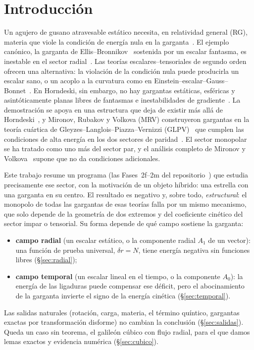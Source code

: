\documentclass[11pt,a4paper]{article}
\theoremstyle{remark}
\begin{document}
\tableofcontents

\section{Introducción}

Un agujero de gusano atravesable estático necesita, en relatividad general (RG), materia que viole la condición de energía nula en la garganta~\cite{MorrisThorne}. El ejemplo canónico, la garganta de Ellis--Bronnikov~\cite{Ellis,Bronnikov} sostenida por un escalar fantasma, es inestable en el sector radial~\cite{GonzalezGuzmanSarbach}. Las teorías escalares--tensoriales de segundo orden ofrecen una alternativa: la violación de la condición nula puede producirla un escalar sano, o un acoplo a la curvatura como en Einstein--escalar--Gauss--Bonnet~\cite{KKK,Canate}. En Horndeski, sin embargo, no hay gargantas estáticas, esféricas y asintóticamente planas libres de fantasmas e inestabilidades de gradiente~\cite{Rubakov,EvseevMelichev}. La demostración se apoya en una estructura que deja de existir más allá de Horndeski~\cite{Franciolini}, y Mironov, Rubakov y Volkova (MRV) construyeron gargantas en la teoría cuártica de Gleyzes--Langlois--Piazza--Vernizzi (GLPV)~\cite{GLPV} que cumplen las condiciones de alta energía en los dos sectores de paridad~\cite{MRV1,MRV2,MRV3}. El sector monopolar se ha tratado como uno más del sector par, y el análisis completo de Mironov y Volkova~\cite{MironovVolkova} supone que no da condiciones adicionales.

Este trabajo resume un programa (las Fases~2f--2m del repositorio~\cite{repo}) que estudia precisamente ese sector, con la motivación de un objeto híbrido: una estrella con una garganta en su centro. El resultado es negativo y, sobre todo, \emph{estructural}: el monopolo de todas las gargantas de esas teorías falla por un mismo mecanismo, que solo depende de la geometría de dos extremos y del coeficiente cinético del sector impar o tensorial. Su forma depende de qué campo sostiene la garganta:
\begin{itemize}
\item \textbf{campo radial} (un escalar estático, o la componente radial $A_1$ de un vector): una función de prueba universal, $\delta r=N$, tiene energía negativa sin funciones libres (\S\ref{sec:radial});
\item \textbf{campo temporal} (un escalar lineal en el tiempo, o la componente $A_0$): la energía de las ligaduras puede compensar ese déficit, pero el abocinamiento de la garganta invierte el signo de la energía cinética (\S\ref{sec:temporal}).
\end{itemize}
Las salidas naturales (rotación, carga, materia, el término quíntico, gargantas exactas por transformación disforme) no cambian la conclusión (\S\ref{sec:salidas}). Queda un caso sin teorema, el galileón cúbico con flujo radial, para el que damos lemas exactos y evidencia numérica (\S\ref{sec:cubico}).
\end{document}
